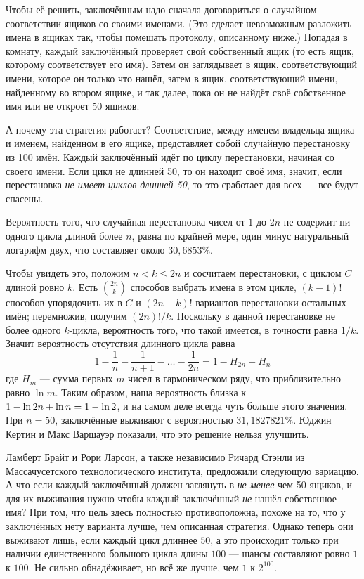 Чтобы её решить, заключённым надо сначала договориться о случайном соответствии ящиков со своими именами.
(Это сделает невозможным разложить имена в ящиках так, чтобы помешать протоколу, описанному ниже.)
Попадая в комнату, каждый заключённый проверяет свой собственный ящик (то есть ящик, которому соответствует его имя).
Затем он заглядывает в ящик, соответствующий имени, которое он только что нашёл,
затем в ящик, соответствующий имени, найденному во втором ящике, и так далее, пока он не найдёт своё собственное имя или не откроет 50 ящиков.

А почему эта стратегия работает?
Соответствие, между именем владельца ящика и именем, найденном в его ящике, представляет собой случайную перестановку из 100 имён.
Каждый заключённый идёт по циклу перестановки, начиная со своего имени.
Если цикл не длинней 50, то он находит своё имя,
значит, если перестановка \emph{не имеет циклов длинней 50}, то это сработает для всех --- все будут спасены.

Вероятность того, что случайная перестановка чисел от $1$ до $2n$ не содержит ни одного цикла длиной более $n$, равна по крайней мере, один минус натуральный логарифм двух, что составляет около $30{,}6853\%$.

Чтобы увидеть это, положим $n < k \le 2n$ и сосчитаем перестановки, с циклом $C$ длиной ровно $k$.
Есть $\binom{2n}k$ способов выбрать имена в этом цикле, $(k - 1)!$ способов упорядочить их в $C$
и $(2n - k)!$ вариантов перестановки остальных имён;
перемножив, получим $(2n)!/k$.
Поскольку в данной перестановке не более одного $k$-цикла, вероятность того, что такой имеется, в точности равна $1/k$.
Значит вероятность отсутствия длинного цикла равна
\[1-\frac{1}{n}-\frac{1}{n+1}-\dots-\frac{1}{2n}=1-H_{2n}+H_n\]
где $H_m$ --- сумма первых $m$ чисел в гармоническом ряду, что приблизительно равно $\ln m$.
Таким образом, наша вероятность близка к $1 - \ln 2n \z+ \ln n = 1 - \ln 2$, и на самом деле всегда чуть больше этого значения.
При $n = 50$, заключённые выживают с вероятностью $31,1827821\%$.
Юджин Кертин и Макс Варшауэр \cite{13} показали, что это решение нельзя улучшить.

Ламберт Брайт и Рори Ларсон, а также независимо Ричард Стэнли из Массачусетского технологического института, предложили следующую вариацию.
А что если каждый заключённый должен заглянуть в \emph{не менее} чем 50 ящиков, и для их выживания нужно чтобы каждый заключённый \emph{не} нашёл собственное имя?
При том, что цель здесь полностью противоположна, похоже на то, что у заключённых нету варианта лучше, чем описанная стратегия.
Однако теперь они выживают лишь, если каждый цикл длиннее $50$, а это происходит только при наличии единственного большого цикла длины $100$ --- шансы составляют ровно $1$ к $100$.
Не сильно обнадёживает, но всё же лучше, чем $1$ к $2^{100}$.

